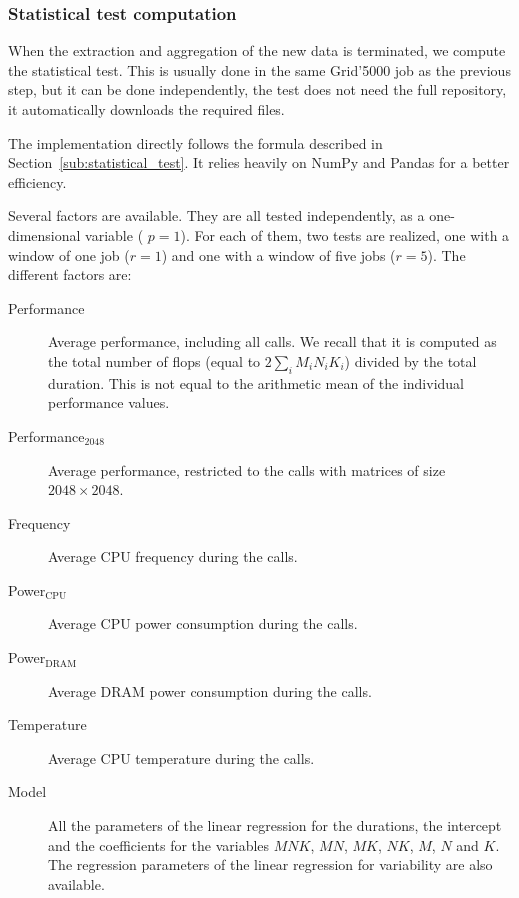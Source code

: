             \subsubsection{Statistical test computation}%

                When the extraction and aggregation of the new data is terminated, we compute the statistical test. This
                is usually done in the same Grid'5000 job as the previous step, but it can be done independently, the
                test does not need the full repository, it automatically downloads the required files.

                The implementation directly follows the formula described in Section~\ref{sub:statistical_test}. It
                relies heavily on NumPy and Pandas for a better efficiency.

                Several factors are available. They are all tested independently, as a one-dimensional variable (\ie
                \(p=1\)). For each of them, two tests are realized, one with a window of one job (\ie \(r=1\)) and one
                with a window of five jobs (\ie \(r=5\)). The different factors are:
                \begin{description}
                    \item[Performance] Average \dgemm performance, including all calls. We recall that it is computed as
                        the total number of flops (equal to \(2\sum_i M_iN_iK_i\)) divided by the total duration. This
                        is not equal to the arithmetic mean of the individual performance values.
                    \item[Performance$_{\text{2048}}$] Average \dgemm performance, restricted to the calls with matrices
                        of size \(2048\times2048\).
                    \item[Frequency] Average CPU frequency during the \dgemm calls.
                    \item[Power$_{\text{CPU}}$] Average CPU power consumption during the \dgemm calls.
                    \item[Power$_{\text{DRAM}}$] Average DRAM power consumption during the \dgemm calls.
                    \item[Temperature] Average CPU temperature during the \dgemm calls.
                    \item[Model] All the parameters of the linear regression for the \dgemm durations, \ie the intercept
                        and the coefficients for the variables \(MNK\), \(MN\), \(MK\), \(NK\), \(M\), \(N\) and \(K\).
                        The regression parameters of the linear regression for \dgemm variability are also available.
                \end{description}

